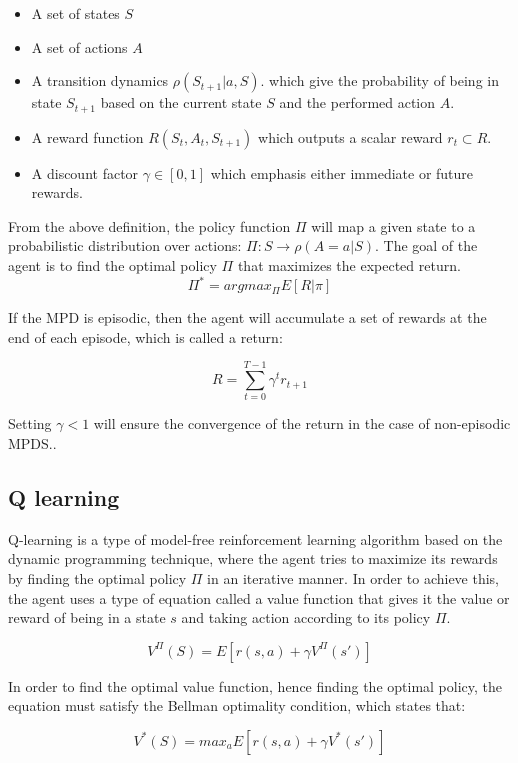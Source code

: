 \documentclass[12pt]{extarticle}
\begin{document}
\begin{itemize}
  \item  A set of states $S$
  \item  A set of actions $A$
  \item  A transition dynamics $\rho(S_{t+1}|a,S)$. which give the probability of being in state $S_{t+1}$ based on the current state $S$ and the performed action $A$.
  \item A reward function $R(S_{t},A_{t},S_{t+1})$ which outputs a scalar reward $r_{t} \subset R$. 
   \item A discount factor $\gamma \in [0,1]$ which  emphasis either  immediate or future rewards.
\end{itemize}

\newpage
From the above definition, the policy function $\Pi$ will map a given state to a probabilistic distribution over actions: $\Pi: S \longrightarrow \rho(A=a|S)$. The goal of the agent is to find the optimal policy $\Pi$ that maximizes the expected return. \\
\[ \Pi^{*} = argmax_{\Pi}  E[R|\pi] \]



If the MPD is episodic, then the agent will accumulate a set of rewards at the end of each episode, which is called a return:

\[ R= \sum_{t=0}^{T-1} \gamma^{t}r_{t+1} \]



Setting $\gamma<1$ will ensure the convergence of the return in the case of non-episodic MPDS.\cite{arulkumaran2017brief}.

\subsection{Q learning}
Q-learning is a type of model-free reinforcement learning algorithm based on the dynamic programming technique, where the agent tries to maximize its rewards by finding the optimal policy $\Pi$ in an iterative manner. In order to achieve this, the agent uses a type of equation called a value function that gives it the value or reward of being in a state $s$ and taking action according to its policy $\Pi$.


\[ V^{\Pi}(S)=E[r(s,a)+\gamma V^{\Pi}(s') ] \] 

In order to find the optimal value function, hence finding the optimal policy, the equation must satisfy the Bellman optimality condition, which states that: 

  
\[ V^{*}(S)=max_{a}E[r(s,a)+\gamma V^{*}(s') ] \] 
\end{document}
